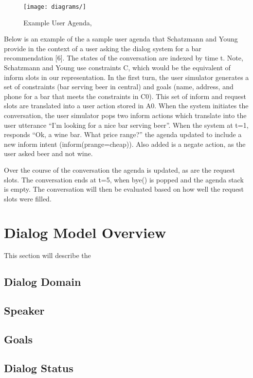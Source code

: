 \begin{figure}[h!]
	\texttt{[image: diagrams/]}
	\caption{Example User Agenda,  }
	\label{fig:goals1}
\end{figure}


Below is an  example of the a sample user agenda that Schatzmann and Young provide in the context of a user asking the dialog system for a bar recommendation [6]. The states of the conversation are indexed by time t. Note, Schatzmann and Young use constraints C, which would be the equivalent of inform slots in our representation. In the first turn, the user simulator generates a set of constraints (bar serving beer in central) and goals (name, address, and phone for a bar that meets the constraints in C0). This set of inform and request slots are translated into a user action stored in A0. When the system initiates the conversation, the user simulator pops two inform actions which translate into the user utterance “I’m looking for a nice bar serving beer”. When the system at t=1, responds “Ok, a wine bar. What price range?” the agenda updated to include a new inform intent (inform(prange=cheap)). Also added is a negate action, as the user asked beer and not wine. 

Over the course of the conversation the agenda is updated, as are the request slots. The conversation ends at t=5, when bye() is popped and the agenda stack is empty. The conversation will then be evaluated based on how well the request slots were filled.



\section{Dialog Model Overview}

This section will describe the 

\subsection{Dialog Domain}
\subsection{Speaker}
\subsection{Goals}
\subsection{Dialog Status}
